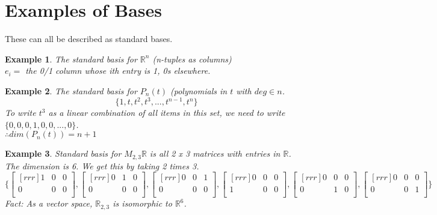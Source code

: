 \documentclass{report}
\newtheorem*{ex}{Example}
\begin{document}
\section{Examples of Bases}
These can all be described as standard bases.
\begin{ex}
The standard basis for $\mathbb{R}^n$ (n-tuples as columns)\\
$e_i = $ the 0/1 column whose ith entry is 1, 0s elsewhere.
\end{ex}
\begin{ex} The standard basis for $P_n(t)$ (polynomials in $t$ with $deg\in n$.
\[ \{1,t,t^2,t^3,...,t^{n-1},t^n\} \]
To write $t^3$ as a linear combination of all items in this set, we need to write $\{ 0,0,0,1,0,0,...,0\}$.\\
$\therefore dim(P_n(t)) = n+1$
\end{ex}
\begin{ex}
Standard basis for $M_{2,3}\mathbb{R}$ is all 2 x 3 matrices with entries in $\mathbb{R}$.\\
The dimension is 6. We get this by taking 2 times 3.
\[ \{\begin{bmatrix}[rrr]1&0&0\\0&0&0\\\end{bmatrix},\begin{bmatrix}[rrr]0&1&0\\0&0&0\\\end{bmatrix}, \begin{bmatrix}[rrr]0&0&1\\0&0&0\\\end{bmatrix}, \begin{bmatrix}[rrr]0&0&0\\1&0&0\\\end{bmatrix}, \begin{bmatrix}[rrr]0&0&0\\0&1&0\\\end{bmatrix}, \begin{bmatrix}[rrr]0&0&0\\0&0&1\\\end{bmatrix}\} \]
Fact: As a vector space, $\mathbb{R}_{2,3}$ is isomorphic to $\mathbb{R}^6$.
\end{ex}
\end{document}
